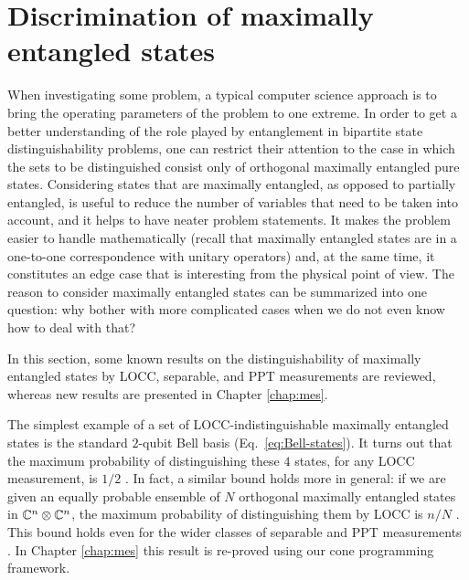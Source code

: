 


\section{Discrimination of maximally entangled states}
\label{sec:mes-intro}

When investigating some problem, a typical computer science approach is 
to bring the operating parameters of the problem to one extreme.
In order to get a better understanding of the role played by entanglement in 
bipartite state distinguishability problems, one can restrict their attention to 
the case in which the sets to be distinguished consist only of orthogonal 
maximally entangled pure states.
Considering states that are maximally entangled, as opposed to partially 
entangled, is useful to reduce the number of variables that need to be taken into account, and
it helps to have neater problem statements. It makes the problem easier to handle mathematically 
(recall that maximally entangled states are in a one-to-one correspondence with 
unitary operators) and, at the same time, it constitutes an edge case that is 
interesting from the physical point of view. The reason to consider maximally entangled states
can be summarized into one question: why bother with 
more complicated cases when we do not even know how to deal with that?

In this section, some known results on the distinguishability of 
maximally entangled states by LOCC, separable, and PPT measurements are reviewed,
whereas new results are presented in Chapter \ref{chap:mes}. 

The simplest example of a set of LOCC-indistinguishable maximally entangled 
states is the standard $2$-qubit Bell basis (Eq.~\eqref{eq:Bell-states}).
It turns out that the maximum probability of distinguishing these $4$ states, 
for any LOCC measurement, is $1/2$ \cite{Ghosh01}. In fact, a similar bound 
holds more in general: if we are given an equally probable ensemble of $N$ 
orthogonal maximally entangled states in $\mathbb{C}^{n}\otimes\mathbb{C}^{n}$, 
the maximum probability of distinguishing them by LOCC is $n/N$ \cite{Ghosh04}.
This bound holds even for the wider classes of separable \cite{Duan09} and PPT 
measurements \cite{Yu12}. In Chapter \ref{chap:mes} this result is re-proved 
using our cone programming framework. 

